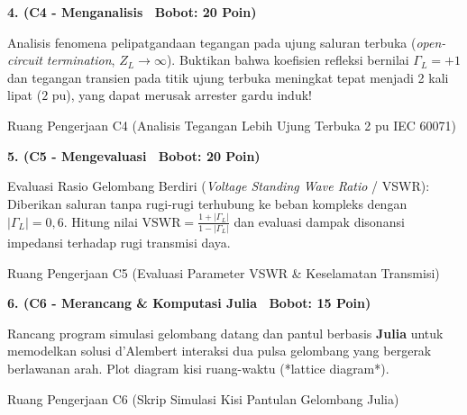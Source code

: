 \documentclass[10pt,a4paper]{article}
\begin{document}
\newpage

\noindent\textbf{4. (C4 - Menganalisis \textbar\ Bobot: 20 Poin)}\par\vspace{0.5mm}
{\footnotesize Analisis fenomena pelipatgandaan tegangan pada ujung saluran terbuka (\textit{open-circuit termination}, $Z_L \to \infty$). Buktikan bahwa koefisien refleksi bernilai $\Gamma_L = +1$ dan tegangan transien pada titik ujung terbuka meningkat tepat menjadi 2 kali lipat ($2\text{ pu}$), yang dapat merusak arrester gardu induk!}
\begin{answerbox}{Ruang Pengerjaan C4 (Analisis Tegangan Lebih Ujung Terbuka 2 pu IEC 60071)}
  \vspace{3.8cm}
\end{answerbox}

\vspace{1.5mm}

\noindent\textbf{5. (C5 - Mengevaluasi \textbar\ Bobot: 20 Poin)}\par\vspace{0.5mm}
{\footnotesize Evaluasi Rasio Gelombang Berdiri (\textit{Voltage Standing Wave Ratio} / VSWR): Diberikan saluran tanpa rugi-rugi terhubung ke beban kompleks dengan $|\Gamma_L| = 0{,}6$. Hitung nilai $\text{VSWR} = \frac{1 + |\Gamma_L|}{1 - |\Gamma_L|}$ dan evaluasi dampak disonansi impedansi terhadap rugi transmisi daya.}
\begin{answerbox}{Ruang Pengerjaan C5 (Evaluasi Parameter VSWR \& Keselamatan Transmisi)}
  \vspace{3.8cm}
\end{answerbox}

\vspace{1.5mm}

\noindent\textbf{6. (C6 - Merancang \& Komputasi Julia \textbar\ Bobot: 15 Poin)}\par\vspace{0.5mm}
{\footnotesize Rancang program simulasi gelombang datang dan pantul berbasis \textbf{Julia} untuk memodelkan solusi d'Alembert interaksi dua pulsa gelombang yang bergerak berlawanan arah. Plot diagram kisi ruang-waktu (*lattice diagram*).}
\begin{answerbox}{Ruang Pengerjaan C6 (Skrip Simulasi Kisi Pantulan Gelombang Julia)}
  \vspace{3.8cm}
\end{answerbox}

\vspace{1.5mm}
\end{document}
